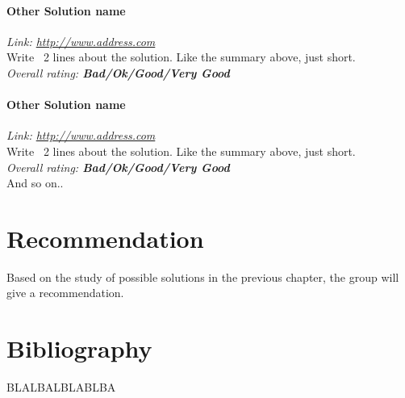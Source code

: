\documentclass[11pt,a4paper,titlepage,oneside]{report}
\begin{document}
\subsubsection{Other Solution name}
\emph{Link: \url{http://www.address.com}} \\%
Write ~2 lines about the solution. Like the summary above, just short.
\\ \emph{Overall rating: \textbf{Bad/Ok/Good/Very Good}}
\subsubsection{Other Solution name}
\emph{Link: \url{http://www.address.com}} \\%
Write ~2 lines about the solution. Like the summary above, just short.
\\ \emph{Overall rating: \textbf{Bad/Ok/Good/Very Good}}
\\ And so on..
\chapter{Recommendation}
Based on the study of possible solutions in the previous chapter, the group will give a recommendation.


\chapter{Bibliography}

\begin{flushleft}
	
	 BLALBALBLABLBA
\end{flushleft}

\appendix
\end{document}
